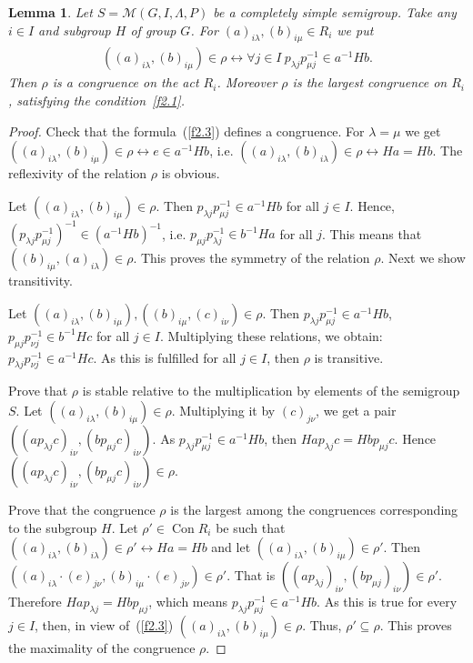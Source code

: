 \documentclass{birkau}
\numberwithin{equation}{section}
\theoremstyle{plain}
\newtheorem{lemma}[theorem]{Lemma}
\theoremstyle{definition}
\DeclareMathOperator{\Con}{Con}
\begin{document}
	\begin{lemma} \label{l2.5}
		Let $S = \mathcal{M}(G,I,\Lambda,P)$ be a completely simple semigroup. Take any $i \in I$ and subgroup $H$ of group $G$. For $(a)_{i \lambda},(b)_{i \mu} \in R_i$ we put
		\begin{gather}
			((a)_{i \lambda},(b)_{i \mu}) \in \rho \leftrightarrow \forall j \in I \ p_{\lambda j} p_{\mu j}^{-1} \in a^{-1} H b. \label{f2.3}
		\end{gather}
		Then $\rho$ is a congruence on the act $R_i$. Moreover $\rho$ is the largest congruence on $R_i$, satisfying the condition~\eqref{f2.1}.
	\end{lemma}
	\begin{proof}
		Check that the formula~(\ref{f2.3}) defines a congruence. For $\lambda = \mu$ we get $((a)_{i \lambda},(b)_{i \mu}) \in \rho \leftrightarrow e \in a^{-1} H b$, i.e. $((a)_{i \lambda},(b)_{i \lambda}) \in \rho \leftrightarrow H a = H b$. The reflexivity of the relation $\rho$ is obvious.
		
		Let $((a)_{i \lambda},(b)_{i \mu}) \in \rho$. Then $p_{\lambda j} p_{\mu j}^{-1} \in a^{-1} H b$ for all $j \in I$. Hence, $(p_{\lambda j} p_{\mu j}^{-1})^{-1} \in (a^{-1} H b)^{-1}$, i.e. $p_{\mu j} p_{\lambda j}^{-1} \in b^{-1} H a$ for all $j$. This means that $((b)_{i \mu},(a)_{i \lambda}) \in \rho$. This proves the symmetry of the relation $\rho$. Next we show transitivity.
		
		Let $((a)_{i \lambda},(b)_{i \mu}),((b)_{i \mu},(c)_{i \nu}) \in \rho$. Then $p_{\lambda j} p_{\mu j}^{-1} \in a^{-1} H b$, $p_{\mu j} p_{\nu j}^{-1} \in b^{-1} H c$ for all $j \in I$. Multiplying these relations, we obtain: $p_{\lambda j} p_{\nu j}^{-1} \in a^{-1} H c$. As this is fulfilled for all $j \in I$, then $\rho$ is transitive.
		
		Prove that $\rho$ is stable relative to the multiplication by elements of the semigroup $S$. Let $((a)_{i \lambda},(b)_{i \mu}) \in \rho$. Multiplying it by $(c)_{j \nu}$, we get a pair $((ap_{\lambda j}c)_{i \nu},(bp_{\mu j}c)_{i \nu})$. As $p_{\lambda j} p_{\mu j}^{-1} \in a^{-1} H b$, then $H a p_{\lambda j} c = H b p_{\mu j} c$. Hence $ \allowbreak ((a p_{\lambda j} c)_{i \nu},(b p_{\mu j} c)_{i \nu}) \in \rho$.
		
		Prove that the congruence $\rho$ is the largest among the congruences corresponding to the subgroup $H$. Let $\rho' \in \Con R_i$ be such that $((a)_{i \lambda},(b)_{i \lambda}) \in \rho' \leftrightarrow H a = H b$ and let $((a)_{i \lambda},(b)_{i \mu}) \in \rho'$. Then $((a)_{i \lambda} \cdot (e)_{j \nu},(b)_{i \mu} \cdot (e)_{j \nu}) \in \rho'$. That is $((a p_{\lambda j})_{i \nu},(b p_{\mu j})_{i \nu}) \in \rho'$. Therefore $H a p_{\lambda j} = H b p_{\mu j}$, which means $p_{\lambda j} p_{\mu j}^{-1} \in a^{-1}H b$. As this is true for every $j \in I$, then, in view of~(\ref{f2.3}) $((a)_{i \lambda},(b)_{i \mu}) \in \rho$. Thus, $\rho' \subseteq \rho$. This proves the maximality of the congruence $\rho$.
	\end{proof}
	
\end{document}
